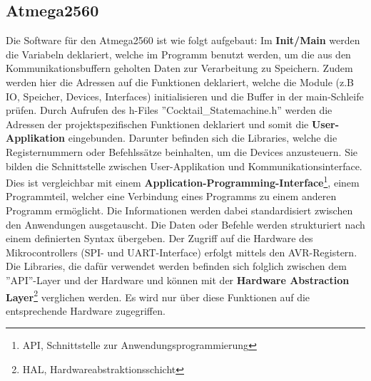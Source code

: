 \subsection{Atmega2560}
\label{subsec:Software_Atmega2560}

Die Software für den Atmega2560 ist wie folgt aufgebaut: 
Im \textbf{Init/Main} werden die Variabeln deklariert, welche im Programm benutzt werden, um die aus den Kommunikationsbuffern geholten Daten zur Verarbeitung zu Speichern.
Zudem werden hier die Adressen auf die Funktionen deklariert, welche die Module (z.B IO, Speicher, Devices, Interfaces) initialisieren und die Buffer in der main-Schleife prüfen.
Durch Aufrufen des h-Files ''Cocktail\_Statemachine.h'' werden die Adressen der projektspezifischen Funktionen deklariert und somit die \textbf{User-Applikation} eingebunden. Darunter befinden sich die Libraries, welche die Registernummern oder Befehlssätze beinhalten, um die Devices anzusteuern.
Sie bilden die Schnittstelle zwischen User-Applikation und Kommunikationsinterface.
Dies ist vergleichbar mit einem \textbf{Application-Programming-Interface}\footnote{API, Schnittstelle zur Anwendungsprogrammierung}, einem Programmteil, welcher eine Verbindung eines Programms zu einem anderen Programm ermöglicht. 
Die Informationen werden dabei standardisiert zwischen den Anwendungen ausgetauscht.
Die Daten oder Befehle werden strukturiert nach einem definierten Syntax übergeben.
Der Zugriff auf die Hardware des Mikrocontrollers (SPI- und UART-Interface) erfolgt mittels den AVR-Registern.
Die Libraries, die dafür verwendet werden befinden sich folglich zwischen dem ''API''-Layer und der Hardware und können mit der \textbf{Hardware Abstraction Layer}\footnote{HAL, Hardwareabstraktionsschicht} verglichen werden.
Es wird nur über diese Funktionen auf die entsprechende Hardware zugegriffen. \cite{geisler_was_2018}